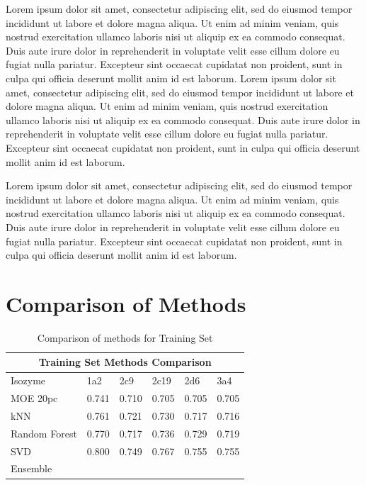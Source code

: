 Lorem ipsum dolor sit amet, consectetur adipiscing elit, sed do eiusmod tempor incididunt ut labore et dolore magna aliqua. Ut enim ad minim veniam, quis nostrud exercitation ullamco laboris nisi ut aliquip ex ea commodo consequat. Duis aute irure dolor in reprehenderit in voluptate velit esse cillum dolore eu fugiat nulla pariatur. Excepteur sint occaecat cupidatat non proident, sunt in culpa qui officia deserunt mollit anim id est laborum. Lorem ipsum dolor sit amet, consectetur adipiscing elit, sed do eiusmod tempor incididunt ut labore et dolore magna aliqua. Ut enim ad minim veniam, quis nostrud exercitation ullamco laboris nisi ut aliquip ex ea commodo consequat. Duis aute irure dolor in reprehenderit in voluptate velit esse cillum dolore eu fugiat nulla pariatur. Excepteur sint occaecat cupidatat non proident, sunt in culpa qui officia deserunt mollit anim id est laborum.

Lorem ipsum dolor sit amet, consectetur adipiscing elit, sed do eiusmod tempor incididunt ut labore et dolore magna aliqua. Ut enim ad minim veniam, quis nostrud exercitation ullamco laboris nisi ut aliquip ex ea commodo consequat. Duis aute irure dolor in reprehenderit in voluptate velit esse cillum dolore eu fugiat nulla pariatur. Excepteur sint occaecat cupidatat non proident, sunt in culpa qui officia deserunt mollit anim id est laborum.

\section{Comparison of Methods}

\begin{table}[!h]
\begin{tabular}{|l|l|l|l|l|l|}
\hline
\multicolumn{6}{|c|}{Training Set Methods Comparison} \\ \hline
Isozyme       & 1a2   & 2c9   & 2c19  & 2d6   & 3a4   \\ \hline
MOE 20pc      & 0.741 & 0.710 & 0.705 & 0.705 & 0.705 \\ \hline
kNN           & 0.761 & 0.721 & 0.730 & 0.717 & 0.716 \\ \hline
Random Forest & 0.770 & 0.717 & 0.736 & 0.729 & 0.719 \\ \hline
SVD           & 0.800 & 0.749 & 0.767 & 0.755 & 0.755 \\ \hline
Ensemble      &       &       &       &       &       \\ \hline
\end{tabular}
\caption{Comparison of methods for Training Set}
\end{table}

